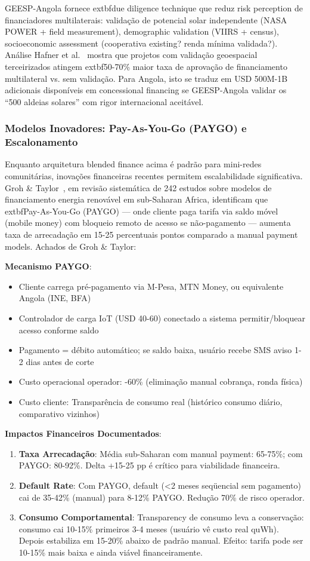\documentclass[12pt, a4paper]{article}
\begin{document}
GEESP-Angola fornece 	extbf{due diligence technique} que reduz risk perception de financiadores multilaterais: validação de potencial solar independente (NASA POWER + field measurement), demographic validation (VIIRS + census), socioeconomic assessment (cooperativa existing? renda mínima validada?). Análise Hafner et al.~\citep{Hafner2020} mostra que projetos com validação geoespacial terceirizados atingem 	extbf{50-70\% maior taxa de aprovação} de financiamento multilateral vs. sem validação. Para Angola, isto se traduz em USD 500M-1B adicionais disponíveis em concessional financing se GEESP-Angola validar os ``500 aldeias solares'' com rigor internacional aceitável.

\subsubsection{Modelos Inovadores: Pay-As-You-Go (PAYGO) e Escalonamento}

Enquanto arquitetura blended finance acima é padrão para mini-redes comunitárias, inovações financeiras recentes permitem escalabilidade significativa. Groh \& Taylor~\citep{Groh2015}, em revisão sistemática de 242 estudos sobre modelos de financiamento energia renovável em sub-Saharan Africa, identificam que 	extbf{Pay-As-You-Go (PAYGO)} — onde cliente paga tarifa via saldo móvel (mobile money) com bloqueio remoto de acesso se não-pagamento — aumenta taxa de arrecadação em 15-25 percentuais pontos comparado a manual payment models. Achados de Groh \& Taylor:

\textbf{Mecanismo PAYGO}:
\begin{itemize}
\item Cliente carrega pré-pagamento via M-Pesa, MTN Money, ou equivalente Angola (INE, BFA)
\item Controlador de carga IoT (USD 40-60) conectado a sistema permitir/bloquear acesso conforme saldo
\item Pagamento = débito automático; se saldo baixa, usuário recebe SMS aviso 1-2 dias antes de corte
\item Custo operacional operador: -60\% (eliminação manual cobrança, ronda física)
\item Custo cliente: Transparência de consumo real (histórico consumo diário, comparativo vizinhos)
\end{itemize}

\textbf{Impactos Financeiros Documentados}:
\begin{enumerate}
\item \textbf{Taxa Arrecadação}: Média sub-Saharan com manual payment: 65-75\%; com PAYGO: 80-92\%. Delta +15-25 pp é crítico para viabilidade financeira.
\item \textbf{Default Rate}: Com PAYGO, default (<2 meses seqüencial sem pagamento) cai de 35-42\% (manual) para 8-12\% PAYGO. Redução 70\% de risco operador.
\item \textbf{Consumo Comportamental}: Transparency de consumo leva a conservação: consumo cai 10-15\% primeiros 3-4 meses (usuário vê custo real quWh). Depois estabiliza em 15-20\% abaixo de padrão manual. Efeito: tarifa pode ser 10-15\% mais baixa e ainda viável financeiramente.
\end{enumerate}
\end{document}
